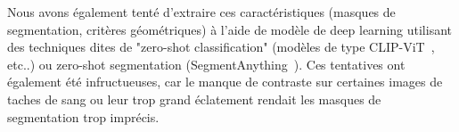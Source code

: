 Nous avons également tenté d'extraire ces caractéristiques (masques de segmentation, critères géométriques) à l'aide de modèle de deep learning
utilisant des techniques dites de "zero-shot classification" (modèles de type CLIP-ViT~\cite{CLip}, etc..) ou zero-shot segmentation (SegmentAnything~\cite{SegmentAnything}). Ces tentatives ont également été infructueuses, car le manque de contraste
sur certaines images de taches de sang ou leur trop grand éclatement rendait les masques de segmentation trop imprécis.



